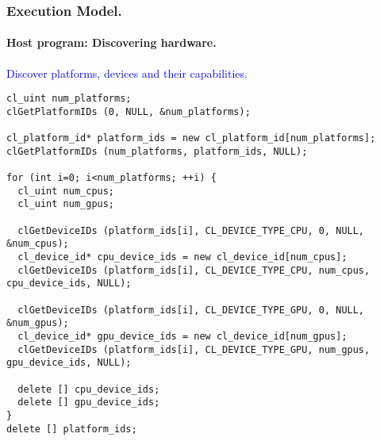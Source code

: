 \documentclass{beamer}
\begin{document}
\begin{frame}[fragile]
\frametitle{Execution Model.}
\framesubtitle{Host program: Discovering hardware.}
  \begin{center}
  \textcolor{blue}{Discover platforms, devices and their capabilities.}
  \end{center}
\begin{center}
\begin{minipage}{0.8\textwidth}
  \begin{lstlisting}
cl_uint num_platforms;
clGetPlatformIDs (0, NULL, &num_platforms);

cl_platform_id* platform_ids = new cl_platform_id[num_platforms];
clGetPlatformIDs (num_platforms, platform_ids, NULL); 

for (int i=0; i<num_platforms; ++i) {
  cl_uint num_cpus;
  cl_uint num_gpus;

  clGetDeviceIDs (platform_ids[i], CL_DEVICE_TYPE_CPU, 0, NULL, &num_cpus);
  cl_device_id* cpu_device_ids = new cl_device_id[num_cpus];
  clGetDeviceIDs (platform_ids[i], CL_DEVICE_TYPE_CPU, num_cpus, cpu_device_ids, NULL);

  clGetDeviceIDs (platform_ids[i], CL_DEVICE_TYPE_GPU, 0, NULL, &num_gpus);
  cl_device_id* gpu_device_ids = new cl_device_id[num_gpus];
  clGetDeviceIDs (platform_ids[i], CL_DEVICE_TYPE_GPU, num_gpus, gpu_device_ids, NULL);

  delete [] cpu_device_ids;
  delete [] gpu_device_ids;
}
delete [] platform_ids;
  \end{lstlisting}
\end{minipage}
\end{center}
\end{frame}
\end{document}
